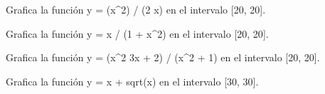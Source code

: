 \documentclass[letterpaper,10pt,spanish]{sphinxmanual}
\begin{document}

\begin{fulllineitems}
\label{\detokenize{pr7:pr7.1.grafico_5}}
\pysigstartsignatures
{}
\pysigstopsignatures
\sphinxAtStartPar
Grafica la función y = (x\textasciicircum{}2) / (2 \sphinxhyphen{} x) en el intervalo {[}\sphinxhyphen{}20, 20{]}.

\end{fulllineitems}


\begin{fulllineitems}
\label{\detokenize{pr7:pr7.1.grafico_6}}
\pysigstartsignatures
{}
\pysigstopsignatures
\sphinxAtStartPar
Grafica la función y = x / (1 + x\textasciicircum{}2) en el intervalo {[}\sphinxhyphen{}20, 20{]}.

\end{fulllineitems}


\begin{fulllineitems}
\label{\detokenize{pr7:pr7.1.grafico_7}}
\pysigstartsignatures
{}
\pysigstopsignatures
\sphinxAtStartPar
Grafica la función y = (x\textasciicircum{}2 \sphinxhyphen{} 3x + 2) / (x\textasciicircum{}2 + 1) en el intervalo {[}\sphinxhyphen{}20, 20{]}.

\end{fulllineitems}


\begin{fulllineitems}
\label{\detokenize{pr7:pr7.1.grafico_8}}
\pysigstartsignatures
{}
\pysigstopsignatures
\sphinxAtStartPar
Grafica la función y = x + sqrt(x) en el intervalo {[}\sphinxhyphen{}30, 30{]}.

\end{fulllineitems}
\end{document}
